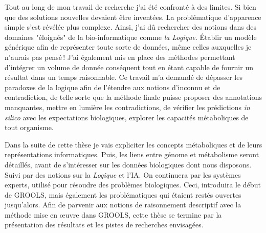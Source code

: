 \begin{refsegment}
Tout au long de mon travail de recherche j'ai été confronté à des limites. Si bien que des solutions nouvelles devaient être inventées. La problématique d'apparence simple s'est révélée plus complexe. Ainsi, j'ai dû rechercher des notions dans des domaines "éloignés" de la bio-informatique comme \textit{la Logique}. Établir un modèle générique afin de représenter toute sorte de données, même celles auxquelles je n'aurais pas pensé ! J'ai également mis en place des méthodes permettant d'intégrer un volume de donnée conséquent tout en étant capable de fournir un résultat dans un temps raisonnable. Ce travail m'a demandé de dépasser les paradoxes de la logique afin de l'étendre aux notions d'inconnu et de contradiction, de telle sorte que la méthode finale puisse proposer des annotations manquantes, mettre en lumière les contradictions, de vérifier les prédictions \textit{in silico} avec les expectations biologiques, explorer les capacités métaboliques de tout organisme.


Dans la suite de cette thèse je vais expliciter les concepts métaboliques et de leurs représentations informatiques. Puis, les liens entre génome et métabolisme seront détaillés, avant de s'intéresser sur les données biologiques dont nous disposons. Suivi par des notions sur la \textit{Logique} et l'\gls{IA}. On continuera par les systèmes experts, utilisé pour résoudre des problèmes biologiques. Ceci, introduira le début de \gls{GROOLS}, mais également les problématiques qui étaient restés ouvertes jusqu'alors. Afin de parvenir aux notions de raisonnement descriptif avec la méthode mise en œuvre dans \gls{GROOLS}, cette thèse se termine par la présentation des résultats et les pistes de recherches envisagées.


\subbibliography
\end{refsegment}